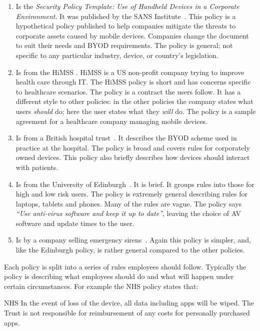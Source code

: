 \documentclass[thesis.tex]{subfiles}
\begin{document}
\begin{enumerate}
\item Is the \emph{Security Policy Template: Use of Handheld Devices
    in a Corporate Environment}. It was published by the SANS
  Institute~\cite{nicholas_r._c._guerin_security_2008}. This policy is a
  hypothetical policy published to help companies mitigate the threats
  to corporate assets caused by mobile devices. Companies change the
  document to suit their needs and BYOD requirements. The policy is
  general; not specific to any particular industry, device, or country's
  legislation.
\item Is from the \ac{HiMSS}
  \cite{healthcare_information_and_management_systems_society_mobile_2012}.
  \ac{HiMSS} is a US non-profit company trying to improve health care through IT.
  The \ac{HiMSS} policy is short and has concerns specific to
  healthcare scenarios. The policy is a contract the users follow. It has
  a different style to other policies: in the other policies the company states
  what users \emph{should} do; here the user states what they \emph{will} do. The policy is
  a sample agreement for a healthcare company managing mobile
  devices.
\item Is from a British hospital trust~\cite{kennington_mobiles_2014}.
  It describes the BYOD scheme used in practice at the hospital.  The
  policy is broad and covers rules for corporately owned devices.  This
  policy also briefly describes how devices should interact with
  patients.
\item Is from the University of
  Edinburgh~\cite{williamson_bring_2015}. It is brief. It groups
  rules into those for high and low risk users.  The policy is extremely general describing rules for
  laptops, tablets and phones.  Many of the rules are vague.
  The policy says \emph{``Use anti-virus software and keep it up
    to date''}, leaving the choice of AV software and
  update times to the user.
\item Is by a company selling emergency
  sirens~\cite{code3pse.org_sample_nodate}. Again this policy is simpler,
  and, like the Edinburgh policy, is rather general compared to the other policies.
\end{enumerate}

Each policy is split into a series of rules employees
should follow. Typically the policy is describing what employees should
do and what will happen under certain circumstances. For example the NHS policy
states that:

\begin{policyrule}{NHS}
  In the event of loss of the device, all data including apps will be wiped. The Trust
  is not responsible for reimbursement of any costs for personally purchased apps.
\end{policyrule}
\end{document}
